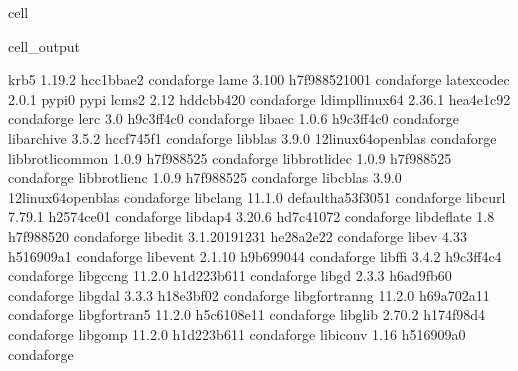 \documentclass[letterpaper,table,10pt,english]{jupyterBook}
\begin{document}
\begin{sphinxuseclass}{cell}
\begin{sphinxVerbatimOutput}
\begin{sphinxuseclass}{cell_output}
\begin{sphinxVerbatim}[commandchars=\\\{\}]
krb5                      1.19.2               hcc1bbae\PYGZus{}2    conda\PYGZhy{}forge
lame                      3.100             h7f98852\PYGZus{}1001    conda\PYGZhy{}forge
latexcodec                2.0.1                    pypi\PYGZus{}0    pypi
lcms2                     2.12                 hddcbb42\PYGZus{}0    conda\PYGZhy{}forge
ld\PYGZus{}impl\PYGZus{}linux\PYGZhy{}64          2.36.1               hea4e1c9\PYGZus{}2    conda\PYGZhy{}forge
lerc                      3.0                  h9c3ff4c\PYGZus{}0    conda\PYGZhy{}forge
libaec                    1.0.6                h9c3ff4c\PYGZus{}0    conda\PYGZhy{}forge
libarchive                3.5.2                hccf745f\PYGZus{}1    conda\PYGZhy{}forge
libblas                   3.9.0           12\PYGZus{}linux64\PYGZus{}openblas    conda\PYGZhy{}forge
libbrotlicommon           1.0.9                h7f98852\PYGZus{}5    conda\PYGZhy{}forge
libbrotlidec              1.0.9                h7f98852\PYGZus{}5    conda\PYGZhy{}forge
libbrotlienc              1.0.9                h7f98852\PYGZus{}5    conda\PYGZhy{}forge
libcblas                  3.9.0           12\PYGZus{}linux64\PYGZus{}openblas    conda\PYGZhy{}forge
libclang                  11.1.0          default\PYGZus{}ha53f305\PYGZus{}1    conda\PYGZhy{}forge
libcurl                   7.79.1               h2574ce0\PYGZus{}1    conda\PYGZhy{}forge
libdap4                   3.20.6               hd7c4107\PYGZus{}2    conda\PYGZhy{}forge
libdeflate                1.8                  h7f98852\PYGZus{}0    conda\PYGZhy{}forge
libedit                   3.1.20191231         he28a2e2\PYGZus{}2    conda\PYGZhy{}forge
libev                     4.33                 h516909a\PYGZus{}1    conda\PYGZhy{}forge
libevent                  2.1.10               h9b69904\PYGZus{}4    conda\PYGZhy{}forge
libffi                    3.4.2                h9c3ff4c\PYGZus{}4    conda\PYGZhy{}forge
libgcc\PYGZhy{}ng                 11.2.0              h1d223b6\PYGZus{}11    conda\PYGZhy{}forge
libgd                     2.3.3                h6ad9fb6\PYGZus{}0    conda\PYGZhy{}forge
libgdal                   3.3.3                h18e3bf0\PYGZus{}2    conda\PYGZhy{}forge
libgfortran\PYGZhy{}ng            11.2.0              h69a702a\PYGZus{}11    conda\PYGZhy{}forge
libgfortran5              11.2.0              h5c6108e\PYGZus{}11    conda\PYGZhy{}forge
libglib                   2.70.2               h174f98d\PYGZus{}4    conda\PYGZhy{}forge
libgomp                   11.2.0              h1d223b6\PYGZus{}11    conda\PYGZhy{}forge
libiconv                  1.16                 h516909a\PYGZus{}0    conda\PYGZhy{}forge

\end{sphinxVerbatim}
\end{sphinxuseclass}
\end{sphinxVerbatimOutput}
\end{sphinxuseclass}
\end{document}
